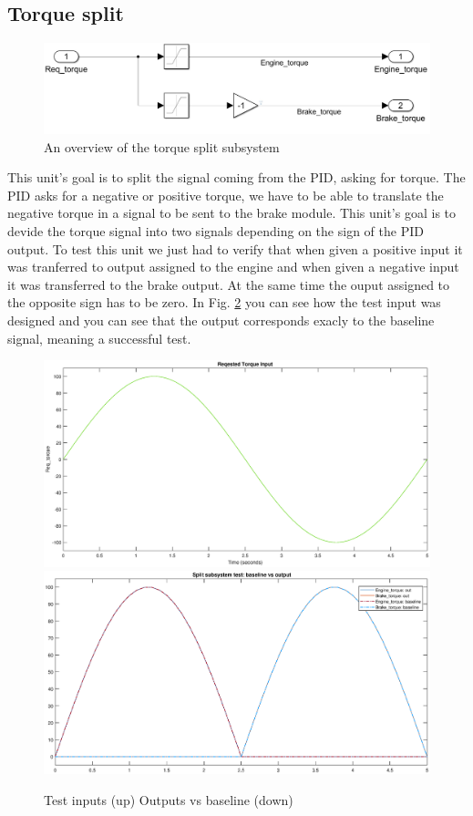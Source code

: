 \documentclass[12pt,a4paper]{report}
\begin{document}
\subsection{Torque split}
\begin{figure}[!h]
	\centering
	\includegraphics[scale=0.34]{split_subs.jpg}
	\caption{An overview of the torque split subsystem}
	\label{split_subs}
\end{figure}
This unit’s goal is to split the signal coming from the PID, asking for torque. The PID asks for a negative or positive torque, we have to be able to translate the negative torque in a signal to be sent to the brake module. This unit’s goal is to devide the torque signal into two signals depending on the sign of the PID output. To test this unit we just had to verify that when given a positive input it was tranferred to output assigned to the engine and when given a negative input it was transferred to the brake output. At the same time the ouput assigned to the opposite sign has to be zero.
In Fig. \ref{input_split_test} you can see how the test input was designed and you can see that the output corresponds exacly to the baseline signal, meaning a successful test.
\begin{figure}[!hbt]
	\centering
	\includegraphics[scale=0.4]{input_split_test}\hfill
	\includegraphics[scale=0.4]{out_split_test}
	\caption{Test inputs (up) Outputs vs baseline (down)}
	\label{input_split_test}
\end{figure}
\FloatBarrier
\end{document}
